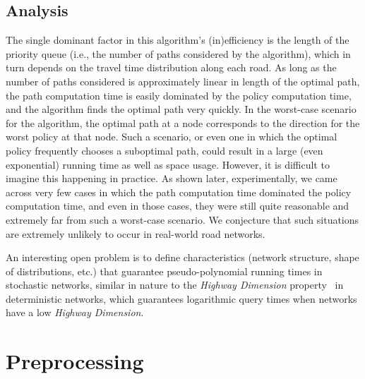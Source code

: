\documentclass[oribibl]{llncs}
\begin{document}
		\subsection{Analysis}

			The single dominant factor in this algorithm's (in)efficiency is the
			length of the priority queue (i.e., the number of paths considered by the algorithm),
			which in turn depends on the travel time distribution along each road.
			As long as the number of paths considered is approximately linear in length of the optimal path,
			the path computation time is easily dominated by the policy computation time, and the algorithm
			finds the optimal path very quickly.
			In the worst-case scenario for the algorithm, the optimal path at a node corresponds to the
			direction for the worst policy at that node.
			Such a scenario, or even one in which the optimal policy frequently chooses a suboptimal path,
			could result in a large (even exponential) running time as well as space usage.
			However, it is difficult to imagine this happening in practice.
			As shown later, experimentally, we came across very few cases in which the path
			computation time dominated the policy computation time, and even in those cases, they were
			still quite reasonable and extremely far from such a worst-case scenario.
			We conjecture that such situations are extremely unlikely to occur in real-world road networks.

			An interesting open problem is to define characteristics (network structure, shape of distributions, etc.)
			that guarantee pseudo-polynomial running times in stochastic networks,
			similar in nature to the \textit{Highway Dimension} property~\cite{abraham2010highway}
			in deterministic networks,
			which guarantees logarithmic query times when networks have a low \textit{Highway Dimension}.

	\section{Preprocessing}
\end{document}
